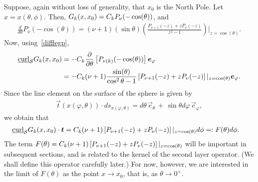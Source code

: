 Suppose, again without loss of generality, that $x_0$ is the North Pole.
Let $x=x(\theta,\phi)$. Then, $G_k(x,x_0) = C_k P_\nu(-\cos(\theta))$,
and
\begin{align}
  \label{difflegp} 
  \frac{d}{d\theta} P_\nu(-\cos(\theta)) =  
    (\nu+1)(\sin\theta) \left( \frac{ P_{\nu+1}(-z) +z
        P_{\nu}(-z)}{z^2-1} 
   \right)\vert_{z=\cos(\theta)}.
\end{align}
Now, using~\eqref{difflegp}, 
\begin{align*}
  \underline{\mbox{curl}}_{\S} G_k(x,x_0)&=-
  \C\frac{\partial}{\partial \theta} \left[P_{\nu(k)}(-\cos(\theta))
  \right] \vec{e}_\varphi \\
  &=-\C(\nu+1)\frac{\sin(\theta)}{\cos^2\theta -1} 
    \left[ P_{\nu+1}(-z) + 
   z 
    P_\nu(-z)\right]\vert_{z=\cos(\theta)} \vec{e}_\varphi. \\
\end{align*}
Since the line element on the surface of the sphere is given by
\begin{align*}
  \vec{t}(x(\varphi,\theta))\cdot ds_{x(\varphi,\theta)} = 
    d\theta\,\vec{e}_{\theta} \,+
    \, \sin\theta d\varphi \,\vec{e}_{\varphi}, 
\end{align*} 
we obtain that
\begin{align}
  \label{curlT}
  \underline{\mbox{curl}}_{\S} G_k(x,x_0)\cdot \vec{t} &= 
  \C (\nu+1)  \left[ P_{\nu+1}(-z) + 
  z P_\nu(-z)\right]\vert_{z=\cos(\theta)} d\phi =: F(\theta)d\phi.
\end{align}
The term $F(\theta)= C_k (\nu+1)  \left[ P_{\nu+1}(-z) + z
P_\nu(-z)\right]\vert_{z=\cos(\theta)}$ will be important in subsequent
sections, and is related to the kernel of the second layer operator.
(We shall define this operator carefully later.) For now, however, we
are interested in the limit of $F(\theta)$ as the point $x\rightarrow
x_0$, that is, as $\theta \rightarrow 0^+$.  

